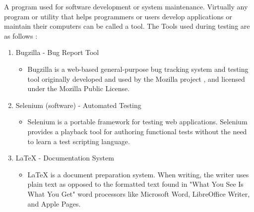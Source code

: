 A program used for software development or system maintenance. Virtually any program
or utility that helps programmers
or users develop applications or maintain their computers can be called a tool.
The Tools used during testing are as follows :

\begin{enumerate}
   \item Bugzilla - Bug Report Tool
   \begin{itemize}
     \item Bugzilla is a web-based general-purpose bug tracking system and testing tool originally developed and used by the Mozilla project
     , and licensed under the Mozilla Public License.
   \end{itemize}
   \item Selenium (software) - Automated Testing
   \begin{itemize}
     \item Selenium is a portable framework for testing web applications. Selenium provides a playback tool for authoring
      functional tests without the need to learn a test scripting language.
   \end{itemize}

   \item  LaTeX - Documentation System
   \begin{itemize}
     \item LaTeX is a document preparation system. When writing, the writer uses plain text as opposed to the formatted text found in "What You See Is What You Get"
      word processors like Microsoft Word, LibreOffice Writer, and Apple Pages.
   \end{itemize}
\end{enumerate}
